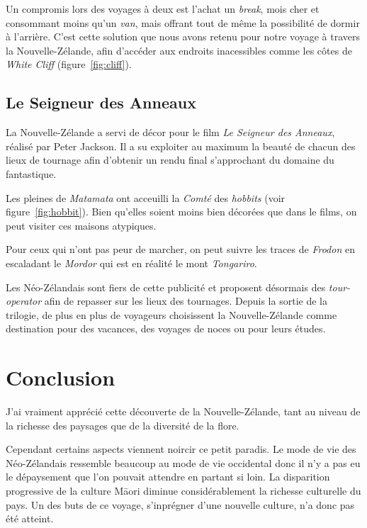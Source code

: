 \documentclass[11pt,journal]{RapportFR}
\newcommand{\Nz}{Nouvelle-Z\'elande\xspace}
\newcommand{\Nzs}{N\'eo-Z\'elandais\xspace}
\begin{document}
Un compromis lors des voyages \`a deux est l'achat un \emph{break}, mois cher et consommant moins qu'un \emph{van}, mais offrant tout de m\^eme la possibilit\'e de dormir \`a l'arri\`ere. C'est cette solution que nous avons retenu pour notre voyage \`a travers la \Nz, afin d'acc\'eder aux endroits inacessibles comme les c\^otes de \emph{White Cliff} (figure~\ref{fig:cliff}).

\subsection{Le Seigneur des Anneaux}
\label{sub:lotr}

La \Nz a servi de d\'ecor pour le film \textit{Le Seigneur des Anneaux}, r\'ealis\'e par Peter Jackson. 
Il a su exploiter au maximum la beaut\'e de chacun des lieux de tournage afin d'obtenir un rendu final s'approchant du domaine du fantastique.

Les pleines de \textit{Matamata} ont acceuilli la \textit{Comté} des \textit{hobbits} (voir figure~\ref{fig:hobbit}). Bien qu'elles soient moins bien d\'ecor\'ees que dans le films, on peut visiter ces maisons atypiques. 

Pour ceux qui n'ont pas peur de marcher, on peut suivre les traces de \emph{Frodon} en escaladant le \textit{Mordor} qui est en r\'ealit\'e le mont \textit{Tongariro}. 


Les \Nzs sont fiers de cette publicit\'e et proposent d\'esormais des \emph{tour-operator} afin de repasser sur les lieux des tournages.
Depuis la sortie de la trilogie, de plus en plus de voyageurs choisissent la \Nz comme destination pour des vacances, des voyages de noces ou pour leurs \'etudes. 


\section{Conclusion}
\label{sec:conclusion}


J'ai vraiment appr\'eci\'e cette d\'ecouverte de la \Nz, tant au niveau de la richesse des paysages que de la diversit\'e de la flore.

Cependant certains aspects viennent noircir ce petit paradis.
Le mode de vie des \Nzs ressemble beaucoup au mode de vie occidental donc il n'y a pas eu le d\'epaysement que l'on pouvait attendre en partant si loin.
La disparition progressive de la culture M\=aori diminue consid\'erablement la richesse culturelle du pays.
Un des buts de ce voyage, s'inpr\'egner d'une nouvelle culture, n'a donc pas \'et\'e atteint.
\end{document}
